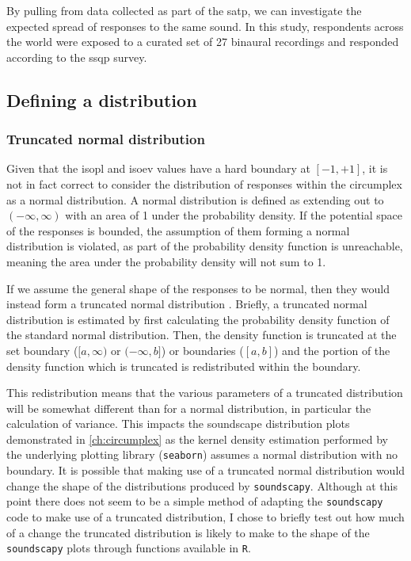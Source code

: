 By pulling from data collected as part of the \gls{satp}, we can investigate the expected spread of responses to the same sound. In this study, respondents across the world were exposed to a curated set of 27 binaural recordings and responded according to the \gls{ssqp} survey. %

\subsection{Defining a distribution}

\subsubsection{Truncated normal distribution}

Given that the \gls{isopl} and \gls{isoev} values have a hard boundary at $[-1, +1]$, it is not in fact correct to consider the distribution of responses within the circumplex as a normal distribution. A normal distribution is defined as extending out to $(-\infty, \infty)$ with an area of 1 under the probability density. If the potential space of the responses is bounded, the assumption of them forming a normal distribution is violated, as part of the probability density function is unreachable, meaning the area under the probability density will not sum to 1.

If we assume the general shape of the responses to be normal, then they would instead form a truncated normal distribution . Briefly, a truncated normal distribution is estimated by first calculating the probability density function of the standard normal distribution. Then, the density function is truncated at the set boundary ($[a, \infty)$ or $(-\infty, b]$) or boundaries ($[a, b]$) and the portion of the density function which is truncated is redistributed within the boundary.

This redistribution means that the various parameters of a truncated distribution will be somewhat different than for a normal distribution, in particular the calculation of variance. This impacts the soundscape distribution plots demonstrated in \cref{ch:circumplex} as the kernel density estimation performed by the underlying plotting library (\texttt{seaborn}) assumes a normal distribution with no boundary. It is possible that making use of a truncated normal distribution would change the shape of the distributions produced by \texttt{soundscapy}. Although at this point there does not seem to be a simple method of adapting the \texttt{soundscapy} code to make use of a truncated distribution, I chose to briefly test out how much of a change the truncated distribution is likely to make to the shape of the \texttt{soundscapy} plots through functions available in \texttt{R}. 

